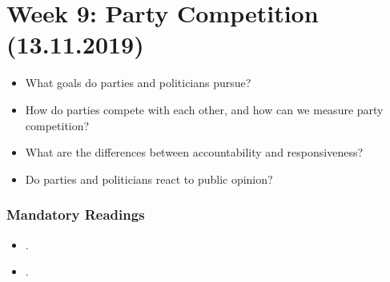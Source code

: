 \documentclass[abstract=on,parskip=full,headings=standardclasses,fontsize=11pt,paper=a4]{scrartcl}
\begin{document}

\section{Week 9:  Party Competition (13.11.2019)}

\begin{itemize}
\renewcommand\labelitemi{--}
\item What goals do parties and politicians pursue?
\item How do parties compete with each other, and how can we measure party competition?
\item What are the differences between accountability and responsiveness?
\item Do parties and politicians react to public opinion? 
\end{itemize}

\subsubsection*{Mandatory Readings}
\begin{itemize}
\item {}.
\item {}.

\end{itemize}
\end{document}
